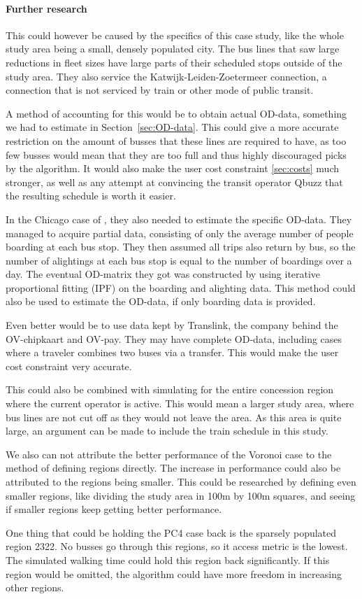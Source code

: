 \paragraph{Further research}
This could however be caused by the specifics of this case study, like the whole study area being a small, densely populated city. The bus lines that saw large reductions in fleet sizes have large parts of their scheduled stops outside of the study area. They also service the Katwijk-Leiden-Zoetermeer connection, a connection that is not serviced by train or other mode of public transit.

A method of accounting for this would be to obtain actual OD-data, something we had to estimate in Section~\ref{sec:OD-data}. This could give a more accurate restriction on the amount of busses that these lines are required to have, as too few busses would mean that they are too full and thus highly discouraged picks by the algorithm. It would also make the user cost constraint \ref{sec:costs} much stronger, as well as any attempt at convincing the transit operator Qbuzz that the resulting schedule is worth it easier.

In the Chicago case of \cite{rumpf}, they also needed to estimate the specific OD-data. They managed to acquire partial data, consisting of only the average number of people boarding at each bus stop. They then assumed all trips also return by bus, so the number of alightings at each bus stop is equal to the number of boardings over a day. The eventual OD-matrix they got was constructed by using iterative proportional fitting (IPF) \cite{PestonMauriceH1971[vBM} on the boarding and alighting data. This method could also be used to estimate the OD-data, if only boarding data is provided.

Even better would be to use data kept by Translink, the company behind the OV-chipkaart and OV-pay. They may have complete OD-data, including cases where a traveler combines two buses via a transfer. This would make the user cost constraint very accurate.

This could also be combined with simulating for the entire concession region where the current operator is active. This would mean a larger study area, where bus lines are not cut off as they would not leave the area. As this area is quite large, an argument can be made to include the train schedule in this study.

We also can not attribute the better performance of the Voronoi case to the method of defining regions directly. The increase in performance could also be attributed to the regions being smaller. This could be researched by defining even smaller regions, like dividing the study area in 100m by 100m squares, and seeing if smaller regions keep getting better performance.

One thing that could be holding the PC4 case back is the sparsely populated region 2322. No busses go through this regions, so it access metric is the lowest. The simulated walking time could hold this region back significantly. If this region would be omitted, the algorithm could have more freedom in increasing other regions.